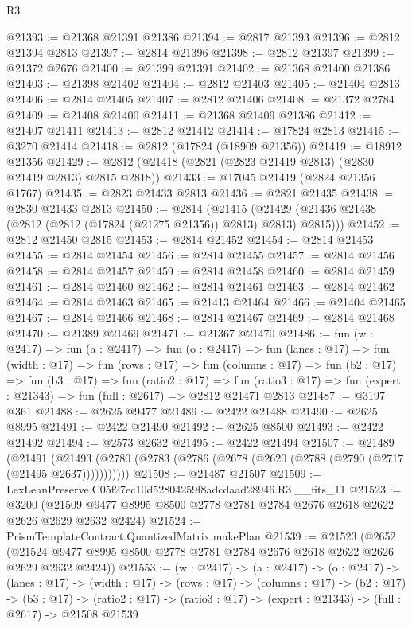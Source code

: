 \begin{lexlean}{R3}
\begin{coremodule}
@21393 := @21368 @21391 @21386
@21394 := @2817 @21393
@21396 := @2812 @21394 @2813
@21397 := @2814 @21396
@21398 := @2812 @21397
@21399 := @21372 @2676
@21400 := @21399 @21391
@21402 := @21368 @21400 @21386
@21403 := @21398 @21402
@21404 := @2812 @21403
@21405 := @21404 @2813
@21406 := @2814 @21405
@21407 := @2812 @21406
@21408 := @21372 @2784
@21409 := @21408 @21400
@21411 := @21368 @21409 @21386
@21412 := @21407 @21411
@21413 := @2812 @21412
@21414 := @17824 @2813
@21415 := @3270 @21414
@21418 := @2812 (@17824 (@18909 @21356))
@21419 := @18912 @21356
@21429 := @2812 (@21418 (@2821 (@2823 @21419 @2813) (@2830 @21419 @2813) @2815 @2818))
@21433 := @17045 @21419 (@2824 @21356 @1767)
@21435 := @2823 @21433 @2813
@21436 := @2821 @21435
@21438 := @2830 @21433 @2813
@21450 := @2814
    (@21415 (@21429 (@21436 @21438 (@2812 (@2812 (@17824 (@21275 @21356)) @2813) @2813) @2815)))
@21452 := @2812 @21450 @2815
@21453 := @2814 @21452
@21454 := @2814 @21453
@21455 := @2814 @21454
@21456 := @2814 @21455
@21457 := @2814 @21456
@21458 := @2814 @21457
@21459 := @2814 @21458
@21460 := @2814 @21459
@21461 := @2814 @21460
@21462 := @2814 @21461
@21463 := @2814 @21462
@21464 := @2814 @21463
@21465 := @21413 @21464
@21466 := @21404 @21465
@21467 := @2814 @21466
@21468 := @2814 @21467
@21469 := @2814 @21468
@21470 := @21389 @21469
@21471 := @21367 @21470
@21486 := fun (w : @2417) =>
  fun (a : @2417) =>
  fun (o : @2417) =>
  fun (lanes : @17) =>
  fun (width : @17) =>
  fun (rows : @17) =>
  fun (columns : @17) =>
  fun (b2 : @17) =>
  fun (b3 : @17) =>
  fun (ratio2 : @17) =>
  fun (ratio3 : @17) => fun (expert : @21343) => fun (full : @2617) => @2812 @21471 @2813
@21487 := @3197 @361
@21488 := @2625 @9477
@21489 := @2422 @21488
@21490 := @2625 @8995
@21491 := @2422 @21490
@21492 := @2625 @8500
@21493 := @2422 @21492
@21494 := @2573 @2632
@21495 := @2422 @21494
@21507 := @21489
    (@21491 (@21493 (@2780 (@2783 (@2786 (@2678 (@2620 (@2788 (@2790 (@2717 (@21495 @2637)))))))))))
@21508 := @21487 @21507
@21509 := LexLeanPreserve.C05f27ec10d52804259f8adcdaad28946.R3.__fits_11
@21523 := @3200
    (@21509 @9477 @8995 @8500 @2778 @2781 @2784 @2676 @2618 @2622 @2626 @2629 @2632 @2424)
@21524 := PrismTemplateContract.QuantizedMatrix.makePlan
@21539 := @21523
    (@2652 (@21524 @9477 @8995 @8500 @2778 @2781 @2784 @2676 @2618 @2622 @2626 @2629 @2632 @2424))
@21553 := (w : @2417) ->
  (a : @2417) ->
  (o : @2417) ->
  (lanes : @17) ->
  (width : @17) ->
  (rows : @17) ->
  (columns : @17) ->
  (b2 : @17) ->
  (b3 : @17) ->
  (ratio2 : @17) -> (ratio3 : @17) -> (expert : @21343) -> (full : @2617) -> @21508 @21539

\end{coremodule}
\end{lexlean}

